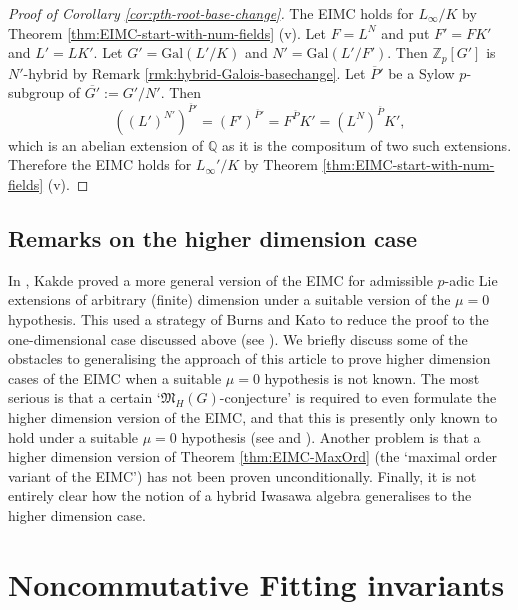 \documentclass[12pt]{amsart}
\theoremstyle{plain}
\theoremstyle{remark}
\theoremstyle{definition}
\numberwithin{equation}{section}
\begin{document}
\begin{proof}[Proof of Corollary \ref{cor:pth-root-base-change}]
The EIMC holds for $L_{\infty}/K$ by Theorem \ref{thm:EIMC-start-with-num-fields} (v).
Let $F=L^{N}$ and put $F'=FK'$ and $L'=LK'$.
Let $G'={\mathrm{Gal}}(L'/K)$ and $N'={\mathrm{Gal}}(L'/F')$.
Then ${\mathbb{Z}}_{p}[G']$ is $N'$-hybrid by Remark \ref{rmk:hybrid-Galois-basechange}.
Let $\overline{P}'$ be a Sylow $p$-subgroup of $\overline{G'}:=G'/N'$.
Then
\[
((L')^{N'})^{\overline{P}'} = (F')^{\overline{P}'} = F^{\overline{P}} K'= (L^{N})^{\overline{P}}K',
\]
which is an abelian extension of ${\mathbb{Q}}$
as it is the compositum of two such extensions.
Therefore the EIMC holds for $L_{\infty}'/K$ by Theorem \ref{thm:EIMC-start-with-num-fields} (v).
\end{proof}

\subsection{Remarks on the higher dimension case} \label{subsec:higher-rk}
In \cite{MR3091976}, Kakde proved a more general version of the EIMC for admissible
$p$-adic Lie extensions of arbitrary (finite) dimension under a suitable version of the $\mu=0$ hypothesis.
This used a strategy of Burns and Kato to reduce the proof to the one-dimensional case discussed above (see \cite{burns-mc}).
We briefly discuss some of the obstacles to generalising the approach of this article to prove higher dimension cases
of the EIMC when a suitable $\mu=0$ hypothesis is not known.
The most serious is that a certain `$\mathfrak{M}_{H}(G)$-conjecture' is required to even formulate
the higher dimension version of the EIMC, and that this is presently only known to hold under a suitable $\mu=0$ hypothesis
(see \cite[p.\ 5]{zbMATH06148870} and \cite{MR2905532}).
Another problem is that a higher dimension version of Theorem \ref{thm:EIMC-MaxOrd} (the `maximal order variant of the EIMC')
has not been proven unconditionally.
Finally, it is not entirely clear how the notion of a hybrid Iwasawa algebra generalises to the higher dimension case.

\section{Noncommutative Fitting invariants} \label{sec:noncommFitt}
\end{document}
